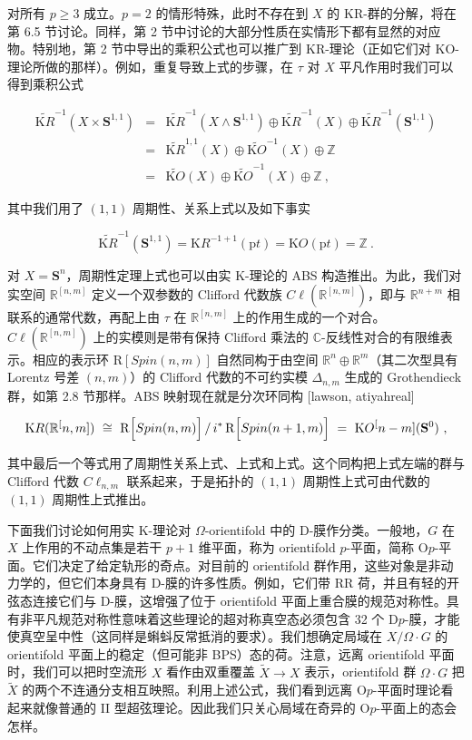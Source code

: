 \documentclass[11pt,a4paper]{ctexart}
\begin{document}
对所有 \(p\geq 3\) 成立。\(p=2\) 的情形特殊，此时不存在到 \(X\) 的 KR-群的分解，将在第 6.5 节讨论。同样，第 2 节中讨论的大部分性质在实情形下都有显然的对应物。特别地，第 2 节中导出的乘积公式也可以推广到 KR-理论（正如它们对 KO-理论所做的那样）。例如，重复导致上式的步骤，在 \(\tau\) 对 \(X\) 平凡作用时我们可以得到乘积公式

\[\begin{matrix}
\widetilde{{\mathrm KR}}^{-1}(X\times{\mathbf S}^{1,1})&=&\widetilde{{\mathrm KR}}^{-1}
(X\wedge{\mathbf S}^{1,1})\oplus\widetilde{{\mathrm KR}}^{-1}(X)\oplus
\widetilde{{\mathrm KR}}^{-1}({\mathbf S}^{1,1})\\
&=&\widetilde{{\mathrm KR}}^{1,1}(X)\oplus\widetilde{{\mathrm KO}}^{-1}(X)
\oplus{\mathbb{Z}}\\
&=&\widetilde{{\mathrm KO}}(X)\oplus\widetilde{{\mathrm KO}}^{-1}(X)\oplus{\mathbb{Z}}\ ,
\end{matrix}\]

其中我们用了 \((1,1)\) 周期性、关系上式以及如下事实

\[\widetilde{{\mathrm KR}}^{-1}({\mathbf S}^{1,1})={\mathrm KR}^{-1+1}({\mathrm pt})
={\mathrm KO}({\mathrm pt})={\mathbb{Z}} \ .\]

对 \(X={\mathbf S}^n\)，周期性定理上式也可以由实 K-理论的 ABS 构造推出。为此，我们对实空间 \({\mathbb{R}}^[n,m]\) 定义一个双参数的 Clifford 代数族 \(C\ell({\mathbb{R}}^[n,m])\)，即与 \({\mathbb{R}}^{n+m}\) 相联系的通常代数，再配上由 \(\tau\) 在 \({\mathbb{R}}^[n,m]\) 上的作用生成的一个对合。\(C\ell({\mathbb{R}}^[n,m])\) 上的实模则是带有保持 Clifford 乘法的 \({\mathbb{C}}\)-反线性对合的有限维表示。相应的表示环 \({\mathrm R}[Spin(n,m)]\) 自然同构于由空间 \({\mathbb{R}}^n\oplus{\mathbb{R}}^m\)（其二次型具有 Lorentz 号差 \((n,m)\)）的 Clifford 代数的不可约实模 \(\Delta_{n,m}\) 生成的 Grothendieck 群，如第 2.8 节那样。ABS 映射现在就是分次环同构 [lawson, atiyahreal]

\[{\mathrm KR}({\mathbb{R}}^[n,m])~\cong~{\mathrm R}\Bigl[Spin(n,m)\Bigr]\,/
\,i^*\,{\mathrm R}\Bigl[Spin(n+1,m)\Bigr]~=~{\mathrm KO}^[n-m]({\mathbf S}^0)\ ,\]

其中最后一个等式用了周期性关系上式、上式和上式。这个同构把上式左端的群与 Clifford 代数 \(C\ell_{n,m}\) 联系起来，于是拓扑的 \((1,1)\) 周期性上式可由代数的 \((1,1)\) 周期性上式推出。

下面我们讨论如何用实 K-理论对 \(\Omega\)-orientifold 中的 D-膜作分类。一般地，\(G\) 在 \(X\) 上作用的不动点集是若干 \(p+1\) 维平面，称为 orientifold \(p\)-平面，简称 O\(p\)-平面。它们决定了给定轨形的奇点。对目前的 orientifold 群作用，这些对象是非动力学的，但它们本身具有 D-膜的许多性质。例如，它们带 RR 荷，并且有轻的开弦态连接它们与 D-膜，这增强了位于 orientifold 平面上重合膜的规范对称性。具有非平凡规范对称性意味着这些理论的超对称真空态必须包含 32 个 D\(p\)-膜，才能使真空呈中性（这同样是蝌蚪反常抵消的要求）。我们想确定局域在 \(X/\Omega\cdot G\) 的 orientifold 平面上的稳定（但可能非 BPS）态的荷。注意，远离 orientifold 平面时，我们可以把时空流形 \(X\) 看作由双重覆盖 \(\tilde{X}\rightarrow X\) 表示，orientifold 群 \(\Omega\cdot G\) 把 \(\tilde{X}\) 的两个不连通分支相互映照。利用上述公式，我们看到远离 O\(p\)-平面时理论看起来就像普通的 II 型超弦理论。因此我们只关心局域在奇异的 O\(p\)-平面上的态会怎样。
\end{document}
